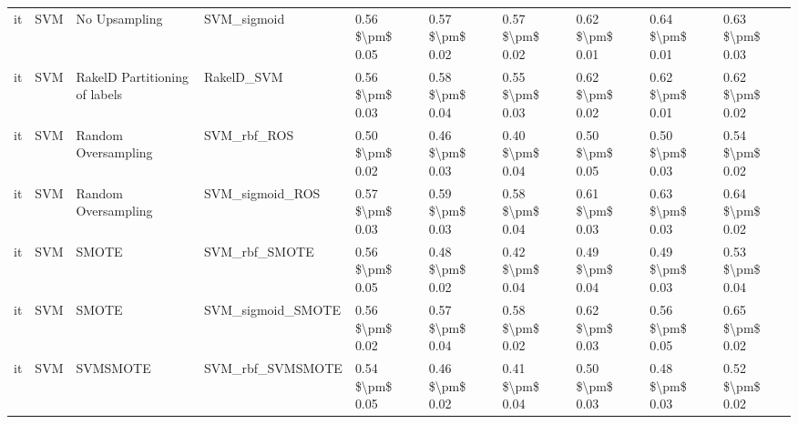 \begin{tabular}{llllllllll}
      it &                             SVM &                 No Upsampling &                                  SVM\_sigmoid &     0.56 \$\textbackslash pm\$ 0.05 &           0.57 \$\textbackslash pm\$ 0.02 &       0.57 \$\textbackslash pm\$ 0.02 &        0.62 \$\textbackslash pm\$ 0.01 &                         0.64 \$\textbackslash pm\$ 0.01 & 0.63 \$\textbackslash pm\$ 0.03 \\
      it &                             SVM & RakelD Partitioning of labels &                                   RakelD\_SVM &     0.56 \$\textbackslash pm\$ 0.03 &           0.58 \$\textbackslash pm\$ 0.04 &       0.55 \$\textbackslash pm\$ 0.03 &        0.62 \$\textbackslash pm\$ 0.02 &                         0.62 \$\textbackslash pm\$ 0.01 & 0.62 \$\textbackslash pm\$ 0.02 \\
      it &                             SVM &           Random Oversampling &                                  SVM\_rbf\_ROS &     0.50 \$\textbackslash pm\$ 0.02 &           0.46 \$\textbackslash pm\$ 0.03 &       0.40 \$\textbackslash pm\$ 0.04 &        0.50 \$\textbackslash pm\$ 0.05 &                         0.50 \$\textbackslash pm\$ 0.03 & 0.54 \$\textbackslash pm\$ 0.02 \\
      it &                             SVM &           Random Oversampling &                              SVM\_sigmoid\_ROS &     0.57 \$\textbackslash pm\$ 0.03 &           0.59 \$\textbackslash pm\$ 0.03 &       0.58 \$\textbackslash pm\$ 0.04 &        0.61 \$\textbackslash pm\$ 0.03 &                         0.63 \$\textbackslash pm\$ 0.03 & 0.64 \$\textbackslash pm\$ 0.02 \\
      it &                             SVM &                         SMOTE &                                SVM\_rbf\_SMOTE &     0.56 \$\textbackslash pm\$ 0.05 &           0.48 \$\textbackslash pm\$ 0.02 &       0.42 \$\textbackslash pm\$ 0.04 &        0.49 \$\textbackslash pm\$ 0.04 &                         0.49 \$\textbackslash pm\$ 0.03 & 0.53 \$\textbackslash pm\$ 0.04 \\
      it &                             SVM &                         SMOTE &                            SVM\_sigmoid\_SMOTE &     0.56 \$\textbackslash pm\$ 0.02 &           0.57 \$\textbackslash pm\$ 0.04 &       0.58 \$\textbackslash pm\$ 0.02 &        0.62 \$\textbackslash pm\$ 0.03 &                         0.56 \$\textbackslash pm\$ 0.05 & 0.65 \$\textbackslash pm\$ 0.02 \\
      it &                             SVM &                      SVMSMOTE &                             SVM\_rbf\_SVMSMOTE &     0.54 \$\textbackslash pm\$ 0.05 &           0.46 \$\textbackslash pm\$ 0.02 &       0.41 \$\textbackslash pm\$ 0.04 &        0.50 \$\textbackslash pm\$ 0.03 &                         0.48 \$\textbackslash pm\$ 0.03 & 0.52 \$\textbackslash pm\$ 0.02 \\

\end{tabular}
